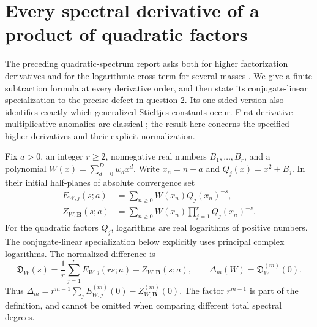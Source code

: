 \section{Every spectral derivative of a product of quadratic factors}
\label{sec:onesided}

The preceding quadratic-spectrum report asks both for higher factorization
derivatives and for the logarithmic cross term for several masses
\cite[Section 7, questions 2 and 7]{Quadratic}.  We give a finite
subtraction formula at every derivative order, and then state its
conjugate-linear specialization to the precise defect in question 2.
Its one-sided version
also identifies exactly which generalized Stieltjes constants occur.
First-derivative multiplicative anomalies are classical
\cite{EVZ,PolynomialAnomaly}; the result here concerns the specified
higher derivatives and their explicit normalization.

Fix $a>0$, an integer $r\ge2$, nonnegative real numbers
$B_1,\ldots,B_r$, and a polynomial
$W(x)=\sum_{d=0}^{D}w_dx^d$.  Write $x_n=n+a$ and
$Q_j(x)=x^2+B_j$.  In their initial half-planes of absolute convergence set
\begin{align}
 E_{W,j}(s;a)&=\sum_{n\ge0}W(x_n)Q_j(x_n)^{-s},\\
 Z_{W,\boldsymbol B}(s;a)&=
       \sum_{n\ge0}W(x_n)\prod_{j=1}^rQ_j(x_n)^{-s}.
\end{align}
For the quadratic factors $Q_j$, logarithms are real logarithms of
positive numbers.  The conjugate-linear specialization below explicitly
uses principal complex logarithms.
The normalized difference is
\begin{equation}\label{one:defect}
 \mathfrak D_W(s)=\frac1r\sum_{j=1}^rE_{W,j}(rs;a)
                         -Z_{W,\boldsymbol B}(s;a),\qquad
 \Delta_m(W)=\mathfrak D_W^{(m)}(0).
\end{equation}
Thus $\Delta_m=r^{m-1}\sum_jE_{W,j}^{(m)}(0)-Z_{W,\boldsymbol B}^{(m)}(0)$.
The factor $r^{m-1}$ is part of the definition, and cannot be omitted
when comparing different total spectral degrees.

